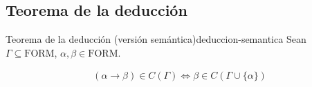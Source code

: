 \subsection{Teorema de la deducción}

\begin{teorema}{Teorema de la deducción %
(versión semántica)}{deduccion-semantica}
    Sean $\Gamma \subseteq \mathrm{FORM}$, $\alpha, \beta \in \mathrm{FORM}$.

    \medskip

    \begin{gather*}
        (\alpha \to \beta) \in C(\Gamma) \iff \beta \in 
        C(\Gamma \cup \{ \alpha \})
    \end{gather*}
\end{teorema}

%

